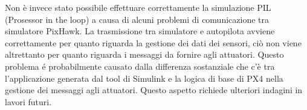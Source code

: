 \begin{commento}
Non è invece stato possibile effettuare correttamente la simulazione PIL (Prosessor in the loop) a causa di alcuni problemi di comunicazione tra simulatore PixHawk. La trasmissione tra simulatore e autopilota avviene correttamente per quanto riguarda la gestione dei dati dei sensori, ciò non viene altrettanto per quanto riguarda i messaggi da fornire agli attuatori. Questo problema é probabilmente causato dalla differenza sostanziale che c'è tra l'applicazione generata dal tool di Simulink e la logica di base di PX4 nella gestione dei messaggi agli attuatori. Questo aspetto richiede ulteriori indagini in lavori futuri.


\end{commento}